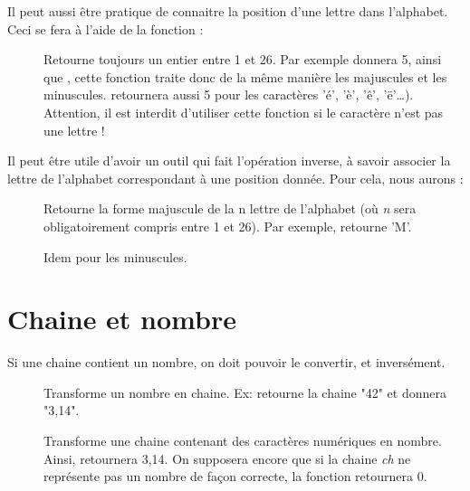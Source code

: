 	Il peut aussi être pratique de connaitre 
	la position d'une lettre dans l'alphabet. 
	Ceci se fera à l'aide de la fonction :

	\begin{description}
	\item[]
		Retourne toujours un entier entre 1 et 26. 
		Par exemple  donnera 5, 
		ainsi que , 
		cette fonction traite donc de la même manière 
		les majuscules et les minuscules. 
		 retournera aussi 5 pour les caractères 'é', 'è', 'ê', 'ë'\dots). 
		Attention, il est interdit d'utiliser cette fonction 
		si le caractère n'est pas une lettre !
	\end{description}
	
	Il peut être utile d'avoir un outil qui fait l'opération inverse, 
	à savoir associer la lettre de l'alphabet correspondant à une position donnée. 
	Pour cela, nous aurons : 

	\begin{description}
	\item[]
		Retourne la forme majuscule de la n\ieme{} lettre de l'alphabet 
		(où \textit{n} sera obligatoirement compris entre 1 et 26). 
		Par exemple,  retourne 'M'.
	\item[]
		Idem pour les minuscules.
	\end{description}
	
\section{Chaine et nombre}

	Si une chaine contient un nombre,
	on doit pouvoir le convertir, et inversément.

	\begin{description}
	\item[]
		Transforme un nombre en chaine.
		Ex:  retourne la chaine "42"
		et  donnera "3,14". 
	\item[]
		Transforme une chaine contenant des caractères numériques 
		en nombre.
		Ainsi,  retournera 3,14. 
		On supposera encore que si la chaine \textit{ch} ne représente pas 
		un nombre de façon correcte, la fonction retournera 0.
	\end{description}
	
